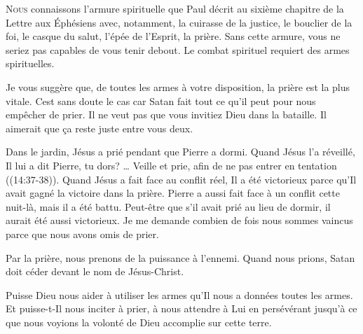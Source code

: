

\lettrine{N}{ous} connaissons l'armure spirituelle que Paul décrit
 au sixième chapitre de la Lettre aux Éphésiens avec, notamment,
 la cuirasse de la justice, le bouclier de la foi, le casque du salut,
 l'épée de l'Esprit, la prière. Sans cette armure,
 vous ne seriez pas capables de vous tenir debout.
 Le combat spirituel requiert des armes spirituelles.

Je vous suggère que, de toutes les armes à votre disposition,
 la prière est la plus vitale. Cest sans doute le cas car Satan
 fait tout ce qu'il peut pour nous empêcher de prier.
 Il ne veut pas que vous invitiez Dieu dans la bataille.
 Il aimerait que \c{c}a reste juste entre vous deux.


Dans le jardin, Jésus a prié pendant que Pierre a dormi.
 Quand Jésus l'a réveillé, Il lui a dit\frcolon {}
 \Og Pierre, tu dors? \dots{} Veille et prie, afin de ne pas entrer
 en tentation \Fg{} ((14:37-38)).
 Quand Jésus a fait face au conflit réel, Il a été victorieux
 parce qu'Il avait gagné la victoire dans la prière.
 Pierre a aussi fait face à un conflit cette nuit-là, mais il a été battu.
 Peut-être que s'il avait prié au lieu de dormir,
 il aurait été aussi victorieux. Je me demande combien de fois
 nous sommes vaincus parce que nous avons omis de prier.

Par la prière, nous prenons de la puissance à l'ennemi.
 Quand nous prions, Satan doit céder devant le nom de Jésus-Christ.

Puisse Dieu nous aider à utiliser les armes qu'Il nous a données
 \ocadr toutes les armes. Et puisse-t-Il nous inciter à prier,
 à nous attendre à Lui en persévérant jusqu'à ce que nous voyions
 la volonté de Dieu accomplie sur cette terre.

\dvrule





